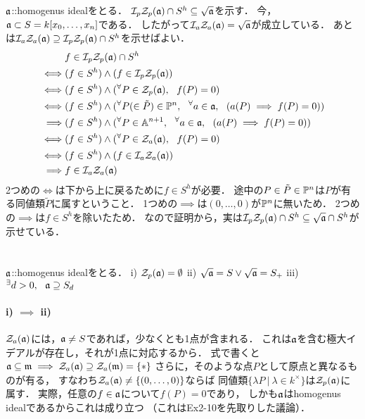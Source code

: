 \documentclass[a4paper]{jsarticle}
\begin{document}
\section{ } %
    $\mathfrak{a}$::homogenus idealをとる．
    $\mathcal{I}_p \mathcal{Z}_p(\mathfrak{a}) \cap S^h \subseteq \sqrt{\mathfrak{a}}$を示す．
    今，$\mathfrak{a} \subset S=k[x_0,\dots,x_n]$である．
    したがって$\mathcal{I}_a \mathcal{Z}_a(\mathfrak{a})=\sqrt{\mathfrak{a}}$が成立している．
    あとは$\mathcal{I}_a \mathcal{Z}_a(\mathfrak{a}) \supseteq \mathcal{I}_p \mathcal{Z}_p(\mathfrak{a}) \cap S^h$を示せばよい．
    \begin{align*}
        {}&     f \in \mathcal{I}_p \mathcal{Z}_p(\mathfrak{a}) \cap S^h \\
        \iff&   (f \in S^h) \land (f \in \mathcal{I}_p \mathcal{Z}_p(\mathfrak{a})) \\
        \iff&   (f \in S^h) \land ( {}^{\forall} P \in \mathcal{Z}_p(\mathfrak{a}),~~ f(P)=0 ) \\
        \iff&   (f \in S^h) \land ( {}^{\forall} P (\in \tilde{P} )\in \mathbb{P}^{n},~~ {}^{\forall} a \in \mathfrak{a},~~ (a(P) \implies f(P)=0) ) \\
        \implies&
                (f \in S^h) \land ( {}^{\forall} P \in \mathbb{A}^{n+1},~~ {}^{\forall} a \in \mathfrak{a},~~ (a(P) \implies f(P)=0) ) \\
        \iff&   (f \in S^h) \land ( {}^{\forall} P \in \mathcal{Z}_a(\mathfrak{a}),~~ f(P)=0 ) \\
        \iff&   (f \in S^h) \land ( f \in \mathcal{I}_a \mathcal{Z}_a(\mathfrak{a}) ) \\
        \implies&   f \in \mathcal{I}_a \mathcal{Z}_a(\mathfrak{a})
    \end{align*}
    2つめの$\iff$は下から上に戻るために$f \in S^h$が必要．
    途中の$P \in \tilde{P} \in \mathbb{P}^{n}$は$P$が有る同値類$\tilde{P}$に属すということ．
    1つめの$\implies$は$(0,\dots,0)$が$\mathbb{P}^n$に無いため．
    2つめの$\implies$は$f \in S^h$を除いたため．
    なので証明から，実は$\mathcal{I}_p \mathcal{Z}_p(\mathfrak{a}) \cap S^h \subseteq \sqrt{\mathfrak{a}} \cap S^h$が示せている．

\section{ } %
    $\mathfrak{a}$::homogenus idealをとる．
    i) $\mathcal{Z}_p(\mathfrak{a})=\emptyset$
    ii) $\sqrt{\mathfrak{a}}=S \lor \sqrt{\mathfrak{a}}=S_{+}$
    iii) ${}^{\exists} d>0,~~ \mathfrak{a} \supseteq S_d$

    \paragraph{i) $\implies$ ii)}
    $\mathcal{Z}_a(\mathfrak{a})$には，$\mathfrak{a} \neq S$であれば，少なくとも1点が含まれる．
    これは$\mathfrak{a}$を含む極大イデアルが存在し，それが1点に対応するから．
    式で書くと$\mathfrak{a} \subseteq \mathfrak{m} \implies \mathcal{Z}_a(\mathfrak{a}) \supseteq \mathcal{Z}_a(\mathfrak{m})=\{ \ast \}$
    さらに，そのような点$P$として原点と異なるものが有る，
    すなわち$\mathcal{Z}_a(\mathfrak{a}) \neq \{(0,\dots,0)\}$ならば
    同値類$\{ \lambda P ~|~ \lambda \in k^{\times} \}$は$\mathcal{Z}_p(\mathfrak{a})$に属す．
    実際，任意の$f \in \mathfrak{a}$について$f(P)=0$であり，
    しかも$\mathfrak{a}$はhomogenus idealであるからこれは成り立つ
    （これはEx2-10を先取りした議論）．
\end{document}
